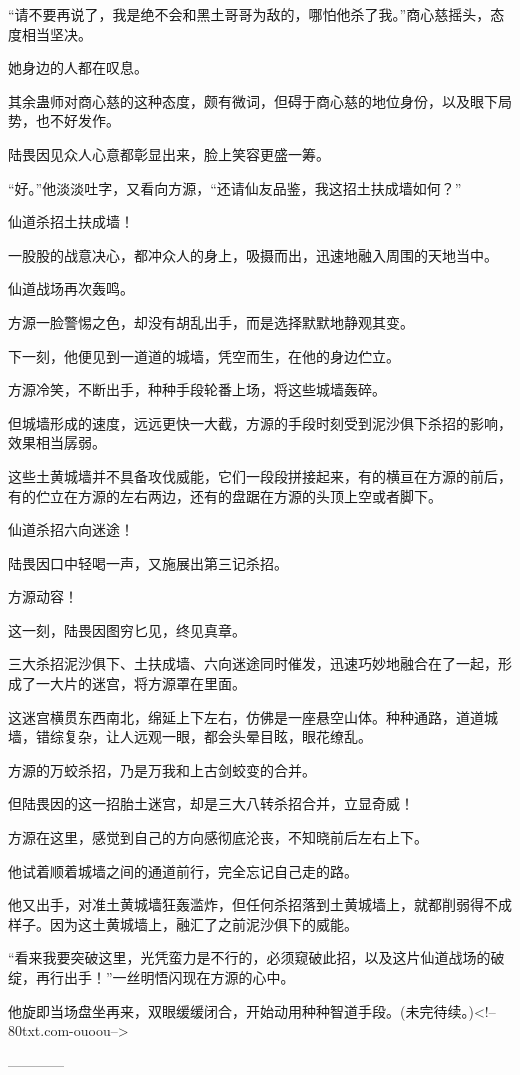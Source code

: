 \begin{this_body}
“请不要再说了，我是绝不会和黑土哥哥为敌的，哪怕他杀了我。”商心慈摇头，态度相当坚决。

她身边的人都在叹息。

其余蛊师对商心慈的这种态度，颇有微词，但碍于商心慈的地位身份，以及眼下局势，也不好发作。

陆畏因见众人心意都彰显出来，脸上笑容更盛一筹。

“好。”他淡淡吐字，又看向方源，“还请仙友品鉴，我这招土扶成墙如何？”

仙道杀招土扶成墙！

一股股的战意决心，都冲众人的身上，吸摄而出，迅速地融入周围的天地当中。

仙道战场再次轰鸣。

方源一脸警惕之色，却没有胡乱出手，而是选择默默地静观其变。

下一刻，他便见到一道道的城墙，凭空而生，在他的身边伫立。

方源冷笑，不断出手，种种手段轮番上场，将这些城墙轰碎。

但城墙形成的速度，远远更快一大截，方源的手段时刻受到泥沙俱下杀招的影响，效果相当孱弱。

这些土黄城墙并不具备攻伐威能，它们一段段拼接起来，有的横亘在方源的前后，有的伫立在方源的左右两边，还有的盘踞在方源的头顶上空或者脚下。

仙道杀招六向迷途！

陆畏因口中轻喝一声，又施展出第三记杀招。

方源动容！

这一刻，陆畏因图穷匕见，终见真章。

三大杀招泥沙俱下、土扶成墙、六向迷途同时催发，迅速巧妙地融合在了一起，形成了一大片的迷宫，将方源罩在里面。

这迷宫横贯东西南北，绵延上下左右，仿佛是一座悬空山体。种种通路，道道城墙，错综复杂，让人远观一眼，都会头晕目眩，眼花缭乱。

方源的万蛟杀招，乃是万我和上古剑蛟变的合并。

但陆畏因的这一招胎土迷宫，却是三大八转杀招合并，立显奇威！

方源在这里，感觉到自己的方向感彻底沦丧，不知晓前后左右上下。

他试着顺着城墙之间的通道前行，完全忘记自己走的路。

他又出手，对准土黄城墙狂轰滥炸，但任何杀招落到土黄城墙上，就都削弱得不成样子。因为这土黄城墙上，融汇了之前泥沙俱下的威能。

“看来我要突破这里，光凭蛮力是不行的，必须窥破此招，以及这片仙道战场的破绽，再行出手！”一丝明悟闪现在方源的心中。

他旋即当场盘坐再来，双眼缓缓闭合，开始动用种种智道手段。(未完待续。)<!--80txt.com-ouoou-->

------------

\end{this_body}

